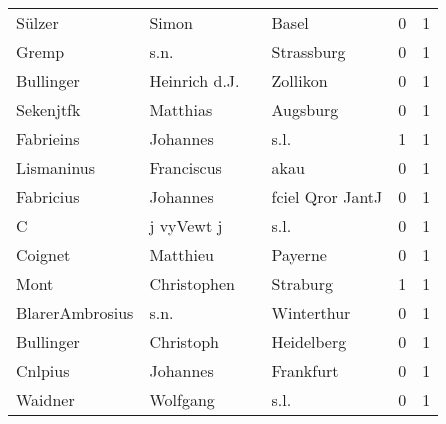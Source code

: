 \begin{center}
\begin{tiny}
\begin{longtabu}{llllrr}
                   Sülzer &                              Simon &             &                                       Basel &          0 &         1 \\
                    Gremp &                               s.n. &             &                                  Strassburg &          0 &         1 \\
                Bullinger &                      Heinrich d.J. &             &                                    Zollikon &          0 &         1 \\
                Sekenjtfk &                           Matthias &             &                                    Augsburg &          0 &         1 \\
                Fabrieins &                           Johannes &             &                                        s.l. &          1 &         1 \\
               Lismaninus &                         Franciscus &             &                                        akau &          0 &         1 \\
                Fabricius &                           Johannes &             &                            fciel Qror JantJ &          0 &         1 \\
                        C &                         j vyVewt j &             &                                        s.l. &          0 &         1 \\
                  Coignet &                           Matthieu &             &                                     Payerne &          0 &         1 \\
                     Mont &                        Christophen &             &                                    Straburg &          1 &         1 \\
          BlarerAmbrosius &                               s.n. &             &                                  Winterthur &          0 &         1 \\
                Bullinger &                          Christoph &             &                                  Heidelberg &          0 &         1 \\
                  Cnlpius &                           Johannes &             &                                   Frankfurt &          0 &         1 \\
                  Waidner &                           Wolfgang &             &                                        s.l. &          0 &         1 \\

\end{longtabu}
\end{tiny}
\end{center}
